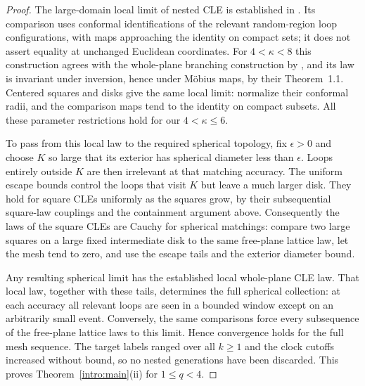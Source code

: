 \begin{proof}
The large-domain local limit of nested CLE is established in
\citet[Appendix~A, Theorem~A.1]{MillerWatsonWilson2015}.  Its comparison
uses conformal identifications of the relevant random-region loop
configurations, with maps approaching the identity on compact sets;
it does not assert equality at unchanged Euclidean coordinates.
For $4<\kappa<8$ this construction agrees with the whole-plane
branching construction by
\citet[Remark~2.6]{GwynneMillerQian2021}, and its law is invariant
under inversion, hence under M\"obius maps, by their Theorem~1.1.
Centered squares and disks give the same local limit: normalize their
conformal radii, and the comparison maps tend to the identity on
compact subsets.  All these parameter restrictions hold for our
$4<\kappa\le6$.

To pass from this local law to the required spherical topology, fix
$\epsilon>0$ and choose $K$ so large that its exterior has spherical
diameter less than $\epsilon$.  Loops entirely outside $K$ are then
irrelevant at that matching accuracy.  The uniform escape bounds
control the loops that visit $K$ but leave a much larger disk.  They
hold for square CLEs uniformly as the squares grow, by their
subsequential square-law couplings and the containment argument above.
Consequently the laws of the square CLEs are Cauchy for spherical
matchings: compare two large squares on a large fixed intermediate
disk to the same free-plane lattice law, let the mesh tend to zero,
and use the escape tails and the exterior diameter bound.

Any resulting spherical limit has the established local whole-plane
CLE law.  That local law, together with these tails, determines the
full spherical collection: at each accuracy all relevant loops are
seen in a bounded window except on an arbitrarily small event.
Conversely, the same comparisons force every subsequence of the
free-plane lattice laws to this limit.  Hence convergence holds for
the full mesh sequence.  The target labels ranged over all $k\ge1$
and the clock cutoffs increased without bound, so no nested generations
have been discarded.  This proves Theorem~\ref{intro:main}(ii) for $1\le q<4$.
\end{proof}
